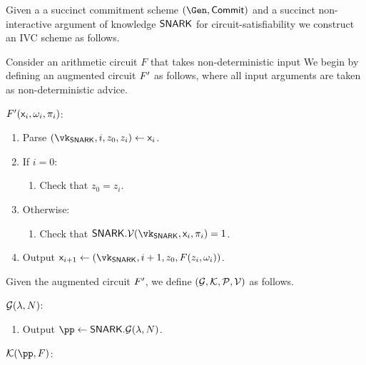 
\begin{construction}\label{cons:ivc}
  Given a 
  a succinct commitment scheme
  $(\Gen, \Commit)$
  and a
  succinct non-interactive argument of knowledge 
  $\mathsf{SNARK}$ for circuit-satisfiability
  we construct an IVC scheme as follows.
  
  Consider an arithmetic circuit $F$ 
  that takes non-deterministic input
  We begin by defining an augmented circuit
  $F'$
  as follows,
  where all input arguments are taken as non-deterministic advice.
  \begin{mdframed}[nobreak=true]
    \noindent \underline{$F'(\mathsf{x}_i, \omega_i, \pi_i)$}:
    \begin{enumerate}
      \item Parse $(\vk_\snark, i, z_0, z_i) \gets \io_i$.
      \item  If $i = 0$:
      \begin{enumerate}
        \item Check that $z_0 = z_i$.
        \label{ivc:fp:base}
      \end{enumerate}
      \item Otherwise:
      \begin{enumerate} 
        \item Check that $\snark.\V(\vk_\snark, \io_i, \pi_i) = 1$.
        \label{ivc:fp:check:general}
      \end{enumerate}
      \item Output $\io_{i + 1} \gets (\vk_{\snark}, i + 1, z_0, F(z_i, \omega_i))$.
      \label{ivc:fp:output}
    \end{enumerate}  
  \end{mdframed} 
  Given the augmented circuit $F'$,
  we define $(\mathcal{G}, \mathcal{K}, \mathcal{P}, \mathcal{V})$ as follows.
  \begin{mdframed}[nobreak=true]
    \underline{$\mathcal{G}(\lambda, N)$}:
    \begin{enumerate}
      \item Output $\pp \gets \snark.\mathcal{G}({\lambda}, N)$.
    \end{enumerate}
  \end{mdframed}
  \begin{mdframed}[nobreak=true]
    \underline{$\En(\pp, F)$}:
    \begin{enumerate}
      

\end{enumerate}
\end{mdframed}
\end{construction}
